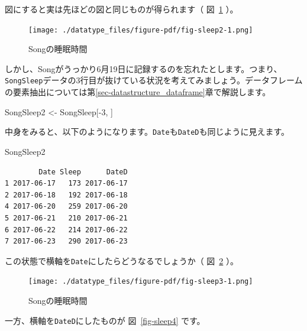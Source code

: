 \documentclass[
  a4paper,
  pandoc,
  ja=standard,
  jafont=haranoaji]{bxjsbook}
\newenvironment{Shaded}{\begin{snugshade}}{\end{snugshade}}
\newcommand{\DecValTok}[1]{\textcolor[rgb]{0.68,0.00,0.00}{#1}}
\newcommand{\NormalTok}[1]{\textcolor[rgb]{0.00,0.48,0.65}{#1}}
\newcommand{\OtherTok}[1]{\textcolor[rgb]{0.00,0.48,0.65}{#1}}
\newcommand{\SpecialCharTok}[1]{\textcolor[rgb]{0.37,0.37,0.37}{#1}}
\begin{document}
図にすると実は先ほどの図と同じものが得られます（ 図~\ref{fig-sleep2}
）。

\begin{figure}

{\centering \texttt{[image: ./datatype\_files/figure-pdf/fig-sleep2-1.png]}

}

\caption{\label{fig-sleep2}Songの睡眠時間}

\end{figure}

しかし、Songがうっかり6月19日に記録するのを忘れたとします。つまり、\texttt{SongSleep}データの3行目が抜けている状況を考えてみましょう。データフレームの要素抽出については第\ref{sec-datastructure_dataframe}章で解説します。

\begin{Shaded}
\begin{Highlighting}[numbers=left,,]
\NormalTok{SongSleep2 }\OtherTok{\textless{}{-}}\NormalTok{ SongSleep[}\SpecialCharTok{{-}}\DecValTok{3}\NormalTok{, ]}
\end{Highlighting}
\end{Shaded}

中身をみると、以下のようになります。\texttt{Date}も\texttt{DateD}も同じように見えます。

\begin{Shaded}
\begin{Highlighting}[numbers=left,,]
\NormalTok{SongSleep2}
\end{Highlighting}
\end{Shaded}

\begin{verbatim}
        Date Sleep      DateD
1 2017-06-17   173 2017-06-17
2 2017-06-18   192 2017-06-18
4 2017-06-20   259 2017-06-20
5 2017-06-21   210 2017-06-21
6 2017-06-22   214 2017-06-22
7 2017-06-23   290 2017-06-23
\end{verbatim}

この状態で横軸を\texttt{Date}にしたらどうなるでしょうか（
図~\ref{fig-sleep3} ）。

\begin{figure}

{\centering \texttt{[image: ./datatype\_files/figure-pdf/fig-sleep3-1.png]}

}

\caption{\label{fig-sleep3}Songの睡眠時間}

\end{figure}

一方、横軸を\texttt{DateD}にしたものが 図~\ref{fig-sleep4} です。
\end{document}
